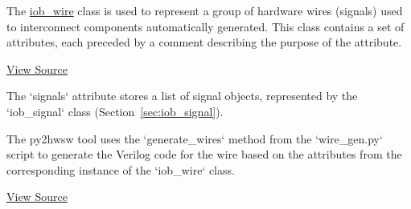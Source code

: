 %

%
%

The \href{https://github.com/IObundle/py2hwsw/blob/main/py2hwsw/scripts/iob_wire.py}{iob\_wire} class is used to represent a group of hardware wires (signals) used to interconnect components automatically generated.
This class contains a set of attributes, each preceded by a comment describing the purpose of the attribute.

\href{https://github.com/IObundle/py2hwsw/blob/main/py2hwsw/scripts/iob_wire.py}{View Source}

The `signals` attribute stores a list of signal objects, represented by the `iob\_signal` class (Section~\ref{sec:iob_signal}).

%
%

The py2hwsw tool uses the `generate\_wires` method from the `wire\_gen.py` script to generate the Verilog code for the wire based on the attributes from the corresponding instance of the `iob\_wire` class.

\href{https://github.com/IObundle/py2hwsw/blob/main/py2hwsw/scripts/wire_gen.py}{View Source}
